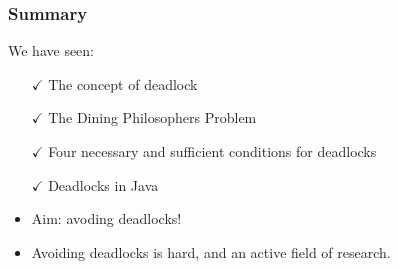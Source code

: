 \begin{frame}
  \frametitle{Summary}

  We have seen:
      \begin{itemize}
        \item[{\color{DarkGreen}$\checkmark$}] The concept of deadlock
        \item[{\color{DarkGreen}$\checkmark$}] The Dining Philosophers Problem
        \item[{\color{DarkGreen}$\checkmark$}] Four necessary and sufficient conditions for deadlocks
        \item[{\color{DarkGreen}$\checkmark$}] Deadlocks in Java
      \end{itemize}

      \vspace{.7cm}
  \begin{tcolorbox}[colback=white,colframe=DarkRed]
    \begin{itemize}
      \item \alert{Aim:} avoding deadlocks!
      \item Avoiding deadlocks is hard, and an active field of research.
    \end{itemize}
  \end{tcolorbox}
\end{frame}
